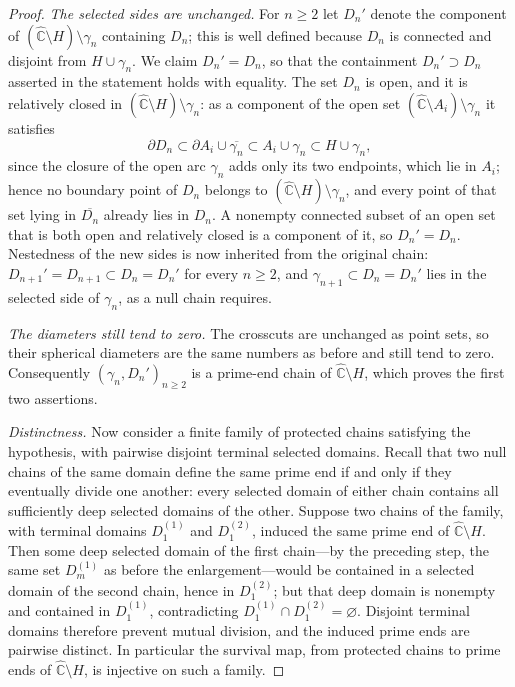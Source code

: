 \documentclass[11pt,reqno]{amsart}
\theoremstyle{definition}
\theoremstyle{remark}
\newcommand{\Chat}{\widehat{\mathbb C}}
\begin{document}
\begin{proof}
\emph{The selected sides are unchanged.}
For $n\ge2$ let $D_n'$ denote the component of
$(\Chat\setminus H)\setminus\gamma_n$ containing $D_n$; this is
well defined because $D_n$ is connected and disjoint from
$H\cup\gamma_n$.  We claim $D_n'=D_n$, so that the containment
$D_n'\supset D_n$ asserted in the statement holds with equality.  The
set $D_n$ is open, and it is relatively closed in
$(\Chat\setminus H)\setminus\gamma_n$: as a component of the open set
$(\Chat\setminus A_i)\setminus\gamma_n$ it satisfies
\[
\partial D_n
\subset\partial A_i\cup\overline{\gamma_n}
\subset A_i\cup\gamma_n
\subset H\cup\gamma_n,
\]
since the closure of the open arc $\gamma_n$ adds only its two
endpoints, which lie in $A_i$; hence no boundary point of $D_n$ belongs
to $(\Chat\setminus H)\setminus\gamma_n$, and every point of that set
lying in $\overline{D_n}$ already lies in $D_n$.  A nonempty connected
subset of an open set that is both open and relatively closed is a
component of it, so $D_n'=D_n$.  Nestedness of the new sides is now
inherited from the original chain:
$D_{n+1}'=D_{n+1}\subset D_n=D_n'$ for every $n\ge2$, and
$\gamma_{n+1}\subset D_n=D_n'$ lies in the selected side of $\gamma_n$,
as a null chain requires.

\emph{The diameters still tend to zero.}
The crosscuts are unchanged as point sets, so their spherical diameters
are the same numbers as before and still tend to zero.  Consequently
$(\gamma_n,D_n')_{n\ge2}$ is a prime-end chain of $\Chat\setminus H$,
which proves the first two assertions.

\emph{Distinctness.}
Now consider a finite family of protected chains satisfying the
hypothesis, with pairwise disjoint terminal selected domains.  Recall
that two null chains of the same domain define the same prime end if and
only if they eventually divide one another: every selected domain of
either chain contains all sufficiently deep selected domains of the
other.  Suppose two chains of the family, with terminal domains
$D_1^{(1)}$ and $D_1^{(2)}$, induced the same prime end of
$\Chat\setminus H$.  Then some deep selected domain of the first
chain---by the preceding step, the same set $D_m^{(1)}$ as before the
enlargement---would be contained in a selected domain of the second
chain, hence in $D_1^{(2)}$; but that deep domain is nonempty and
contained in $D_1^{(1)}$, contradicting
$D_1^{(1)}\cap D_1^{(2)}=\varnothing$.  Disjoint terminal domains
therefore prevent mutual division, and the induced prime ends are
pairwise distinct.  In particular the survival map, from protected
chains to prime ends of $\Chat\setminus H$, is injective on such a
family.


\end{proof}
\end{document}
